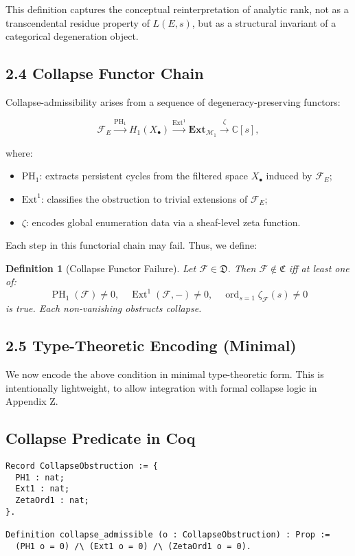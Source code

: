 \documentclass[11pt]{article}
\newtheorem{definition}[theorem]{Definition}
\DeclareMathOperator{\Ext}{Ext}
\DeclareMathOperator{\PH}{PH}
\newcommand{\ord}{\operatorname{ord}}
\begin{document}
This definition captures the conceptual reinterpretation of analytic rank, not as a transcendental residue property of \( L(E,s) \), but as a structural invariant of a categorical degeneration object.

\subsection*{2.4 Collapse Functor Chain}

Collapse-admissibility arises from a sequence of degeneracy-preserving functors:

\[
\mathcal{F}_E \xrightarrow{\mathrm{PH}_1} H_1(X_\bullet) \xrightarrow{\mathrm{Ext}^1} \mathbf{Ext}_{\mathcal{M}_1} \xrightarrow{\zeta} \mathbb{C}[s],
\]

where:

\begin{itemize}
  \item \( \mathrm{PH}_1 \): extracts persistent cycles from the filtered space \( X_\bullet \) induced by \( \mathcal{F}_E \);
  \item \( \mathrm{Ext}^1 \): classifies the obstruction to trivial extensions of \( \mathcal{F}_E \);
  \item \( \zeta \): encodes global enumeration data via a sheaf-level zeta function.
\end{itemize}

Each step in this functorial chain may fail. Thus, we define:

\begin{definition}[Collapse Functor Failure]
Let \( \mathcal{F} \in \mathfrak{D} \). Then \( \mathcal{F} \notin \mathfrak{C} \) iff at least one of:
\[
\PH_1(\mathcal{F}) \neq 0,\quad \Ext^1(\mathcal{F}, -) \neq 0,\quad \ord_{s=1} \zeta_{\mathcal{F}}(s) \neq 0
\]
is true. Each non-vanishing obstructs collapse.
\end{definition}

\subsection*{2.5 Type-Theoretic Encoding (Minimal)}

We now encode the above condition in minimal type-theoretic form. This is intentionally lightweight, to allow integration with formal collapse logic in Appendix Z.

\subsection*{Collapse Predicate in Coq}
\begin{lstlisting}[language=Coq]
Record CollapseObstruction := {
  PH1 : nat;
  Ext1 : nat;
  ZetaOrd1 : nat;
}.

Definition collapse_admissible (o : CollapseObstruction) : Prop :=
  (PH1 o = 0) /\ (Ext1 o = 0) /\ (ZetaOrd1 o = 0).
\end{lstlisting}
\end{document}
